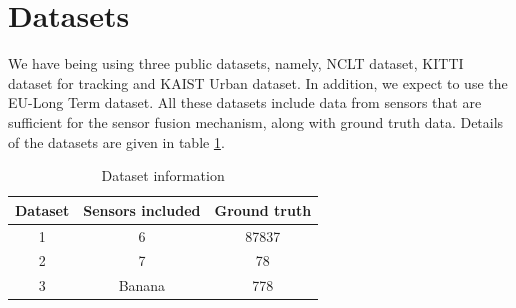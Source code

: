 \section{Datasets}
We have being using three public datasets, namely, \gls{NCLT} dataset\cite{pa:NCLTDataset}, \gls{KITTI} dataset for tracking\cite{pa:KITTIDataset} and \gls{KAIST} Urban dataset\cite{pa:KAISTDataset}. In addition, we expect to use the EU-Long Term dataset\cite{pa:EULTDataset}. All these datasets include data from sensors that are sufficient for the sensor fusion mechanism, along with ground truth data. Details of the datasets are given in table \ref{table:pa:Datasets}.
\begin{table}[h]
\centering
\begin{tabular}{|c | c | c |} 
	\hline
	\textbf{Dataset} & \textbf{Sensors included} & \textbf{Ground truth} \\
	\hline
	1 & 6 & 87837\\
	\hline
	2 & 7 & 78 \\
	\hline
	3 & Banana & 778\\
	\hline
\end{tabular}
\caption{Dataset information}
\label{table:pa:Datasets}
\end{table}








